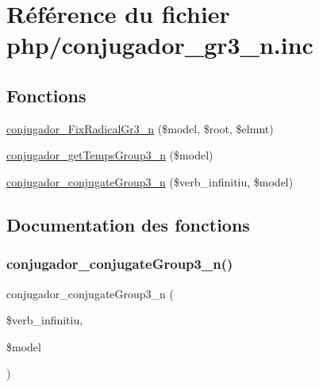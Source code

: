 \hypertarget{php_2conjugador__gr3__n_8inc}{}\section{Référence du fichier php/conjugador\+\_\+gr3\+\_\+n.inc}
\label{php_2conjugador__gr3__n_8inc}
\subsection*{Fonctions}
\begin{DoxyCompactItemize}
\item 
\hyperlink{php_2conjugador__gr3__n_8inc_a8b5eb99580509e77514f575acb094396}{conjugador\+\_\+\+Fix\+Radical\+Gr3\+\_\+n} (\$model, \$root, \$elmnt)
\item 
\hyperlink{php_2conjugador__gr3__n_8inc_a3dfa66bbf35eab81453e7b9f5882de50}{conjugador\+\_\+get\+Temps\+Group3\+\_\+n} (\$model)
\item 
\hyperlink{php_2conjugador__gr3__n_8inc_a177f50afff0c22645daeb42029708d45}{conjugador\+\_\+conjugate\+Group3\+\_\+n} (\$verb\+\_\+infinitiu, \$model)
\end{DoxyCompactItemize}


\subsection{Documentation des fonctions}
\hypertarget{php_2conjugador__gr3__n_8inc_a177f50afff0c22645daeb42029708d45}{}\label{php_2conjugador__gr3__n_8inc_a177f50afff0c22645daeb42029708d45} 
\subsubsection{\texorpdfstring{conjugador\+\_\+conjugate\+Group3\+\_\+n()}{conjugador\_conjugateGroup3\_n()}}
{\footnotesize\ttfamily conjugador\+\_\+conjugate\+Group3\+\_\+n (\begin{DoxyParamCaption}\item[{}]{\$verb\+\_\+infinitiu,  }\item[{}]{\$model }\end{DoxyParamCaption})}

